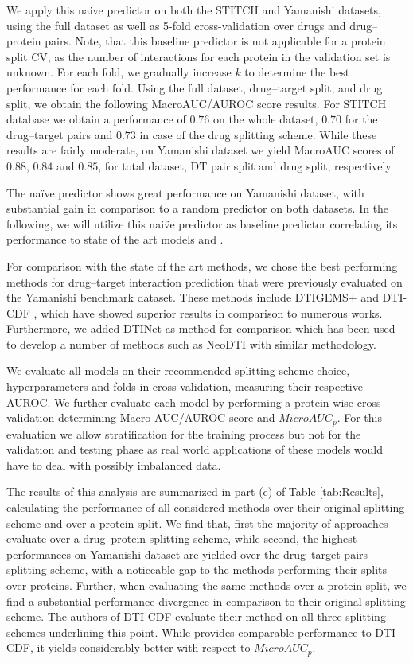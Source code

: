 \documentclass{bioinfo}
\renewcommand{\cite}{\citep}
\begin{document}
We apply this naive predictor on both the STITCH and Yamanishi
datasets, using the full dataset as well as 5-fold cross-validation
over drugs and drug--protein pairs.
Note, that this baseline predictor is not applicable for a protein split CV, as the number of interactions for each protein in the validation set is unknown. 
For each fold, we gradually increase $k$ to determine the best
performance for each fold. Using the full dataset, drug--target split,
and drug split, we obtain the following MacroAUC/AUROC score results. For STITCH database we obtain a performance of $0.76$ on the whole dataset, $0.70$ for the drug--target pairs and $0.73$ in case of the drug splitting scheme. While these results are fairly moderate, on Yamanishi dataset we yield MacroAUC scores of $0.88$, $0.84$ and $0.85$, for total dataset, DT pair split and drug split, respectively. 

The na\"ive predictor shows great performance on Yamanishi dataset, with substantial gain in comparison to a random predictor on both datasets. In the following, we will utilize this nai\"ve predictor as baseline predictor correlating its performance to state of the art models and \name.

For comparison with the state of the art methods, we chose the best
performing methods for drug--target interaction prediction that were
previously evaluated on the Yamanishi benchmark dataset. These methods include DTIGEMS+
\cite{DTIGEMS2020} and DTI-CDF \cite{DTI-CDF2019}, which have showed
superior results in comparison to numerous works. Furthermore, we
added DTINet \cite{DTINet2017} as method for comparison which has been
used to develop a number of methods such as NeoDTI \cite{NeoDTI2019}
with similar methodology.

We evaluate all models on their recommended splitting scheme choice,
hyperparameters and folds in cross-validation, measuring their
respective AUROC. We further evaluate each model by performing a
protein-wise cross-validation determining Macro AUC/AUROC score and
$MicroAUC_p$. For this evaluation we allow stratification for the
training process but not for the validation and testing phase as
real world applications of these models would have to deal with possibly
imbalanced data.

The results of this analysis are summarized in part (c) of Table \ref{tab:Results}, calculating the performance of all considered methods over their original splitting scheme and over a protein split. We find that, first the majority of approaches evaluate over a drug--protein splitting scheme, while second, the highest performances on Yamanishi dataset are yielded over the drug--target pairs splitting scheme, with a noticeable gap to the methods performing their splits over proteins. Further, when evaluating the same methods over a protein split, we find a substantial performance divergence in comparison to their original splitting scheme. The authors of DTI-CDF evaluate their method on all three splitting schemes underlining this point. While \name provides comparable performance to DTI-CDF, it yields considerably better with respect to $MicroAUC_p$. 
\end{document}
